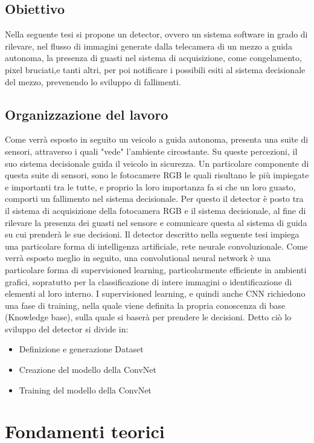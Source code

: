\documentclass[14pt]{extarticle}
\begin{document}
\subsection{Obiettivo}
Nella seguente tesi si propone un detector, ovvero un sistema software in grado di rilevare, nel flusso di immagini generate dalla telecamera di un mezzo a guida autonoma, la presenza di guasti nel sistema di acquisizione, come congelamento, pixel bruciati,e tanti altri, per poi notificare i possibili esiti al sistema  decisionale del mezzo, prevenendo lo sviluppo di fallimenti.
\subsection{Organizzazione del lavoro} 
Come verrà esposto in seguito un veicolo a guida autonoma, presenta una suite di sensori, attraverso i quali "vede" l'ambiente circostante. Su queste percezioni, il suo sistema decisionale guida il veicolo in sicurezza.
Un particolare componente di questa suite di sensori, sono le fotocamere RGB le quali risultano le più impiegate e importanti tra le tutte, e proprio la  loro importanza fa si che un loro guasto,  comporti un fallimento nel sistema decisionale.
Per questo il detector è posto tra il  sistema di acquisizione della fotocamera RGB e il sistema decisionale, al fine di rilevare la presenza dei guasti nel sensore e comunicare questa al sistema di guida su cui prenderà  le sue decisioni.
Il detector descritto nella seguente tesi impiega una particolare forma di intelligenza artificiale, rete neurale convoluzionale.
Come verrà esposto meglio in seguito, una convolutional neural network è una particolare forma di supervisioned learning, particolarmente efficiente in ambienti grafici, sopratutto per la classificazione di intere immagini o identificazione di elementi al loro interno. I supervisioned learning, e quindi anche CNN richiedono una fase di training, nella quale viene definita  la propria conoscenza di base (Knowledge base), sulla quale si baserà per prendere le decisioni.
Detto ciò lo sviluppo del detector si divide in:
\begin{itemize}
\item Definizione e generazione Dataset
\item Creazione del modello della ConvNet
\item Training del modello della ConvNet
\end{itemize}

\section{Fondamenti teorici}
\end{document}
